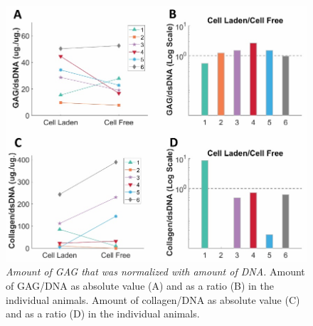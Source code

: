 \documentclass[twocolumn, empirical, authordate, issue]{jote-new-article}
\begin{document}
\begin{figure}
\centering \includegraphics[width=\columnwidth]{media/image14.jpg}
\caption{\emph{Amount of GAG that was normalized with amount of DNA.}  Amount of GAG/DNA as absolute value (A) and as a ratio (B) in the individual animals. Amount of collagen/DNA as absolute value (C) and as a ratio (D) in the individual animals.}
\label{fig:sup3}\end{figure}
\newpage
\twocolumn
\end{document}
